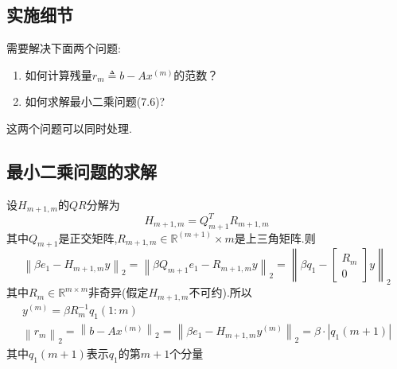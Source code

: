 \documentclass[12pt,a4paper]{article}
\begin{document}
\subsection*{实施细节}
需要解决下面两个问题:
\begin{enumerate}[(1)]
\item 如何计算残量$r_{m} \triangleq b-A x^{(m)}$的范数？
\item 如何求解最小二乘问题(7.6)?
\end{enumerate}
{\color{blue}这两个问题可以同时处理.}\\
\subsection*{最小二乘问题的求解}
设$H_{m+1, m}$的$QR$分解为
$$
H_{m+1, m}=Q_{m+1}^{T} R_{m+1, m}
$$
其中$Q_{m+1}$是正交矩阵,$R_{m+1, m} \in \mathbb{R}^{(m+1)} \times m$是上三角矩阵.则
$$
\left\|\beta e_{1}-H_{m+1, m} y\right\|_{2}=\left\|\beta Q_{m+1} e_{1}-R_{m+1, m} y\right\|_{2}=\left\|\beta q_{1}-\left[\begin{array}{c}{R_{m}} \\ {0}\end{array}\right] y\right\|_{2}
$$
其中$R_{m} \in \mathbb{R}^{m \times m}$非奇异(假定$H_{m+1, m}$不可约).所以
$$
\begin{array}{l}{y^{(m)}=\beta R_{m}^{-1} q_{1}(1 : m)} \\ {\left\|r_{m}\right\|_{2}=\left\|b-A x^{(m)}\right\|_{2}=\left\|\beta e_{1}-H_{m+1, m} y^{(m)}\right\|_{2}=\beta \cdot\left|q_{1}(m+1)\right|}\end{array}
$$
其中$q_{1}(m+1)$表示$q_1$的第$m+ 1$个分量
\end{document}
